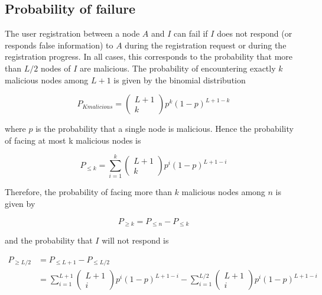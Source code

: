   \subsection{Probability of failure}
    The user registration between a node $A$ and $I$ can fail if $I$ does
not respond (or responds false information) to $A$ during the registration request or during the registration
progress. In all cases, this corresponds to the probability that more than
$L/2$ nodes of $I$ are malicious. The probability of encountering exactly $k$
malicious nodes among $L +1$ is given by the binomial distribution

    \begin{equation} \label{eq:p_k_malicious_nodes}
      P_{K malicious} = \begin{pmatrix} L+1 \\ k\end{pmatrix} p^k (1-p)^{L+1-k}
    \end{equation}

    where $p$ is the probability that a single node is malicious. Hence the
probability of facing at most k malicious nodes is 

    \begin{equation}
      P_{\leq k} = \sum_{i=1}^{k} \begin{pmatrix} L+1 \\ k\end{pmatrix} p^i (1-p)^{L+1-i}
    \end{equation}

    Therefore, the probability of facing more than $k$ malicious nodes among
$n$ is given by

    \begin{equation} \label{eq:p_malicious_ge_k}
      P_{\ge k} = P_{\leq n} - P_{\leq k}
    \end{equation}

    and the probability that $I$ will not respond is


    \begin{align} \label{eq:p_malicious_ge_L_2}
      P_{\ge L/2} &= P_{\leq L+1} - P_{\leq L/2} \\
      &= \sum_{i=1}^{L+1} \begin{pmatrix} L+1 \\ i\end{pmatrix} p^i (1-p)^{L+1-i}
      - \sum_{i=1}^{L/2} \begin{pmatrix} L+1 \\ i\end{pmatrix} p^i (1-p)^{L+1-i}
    \end{align}

